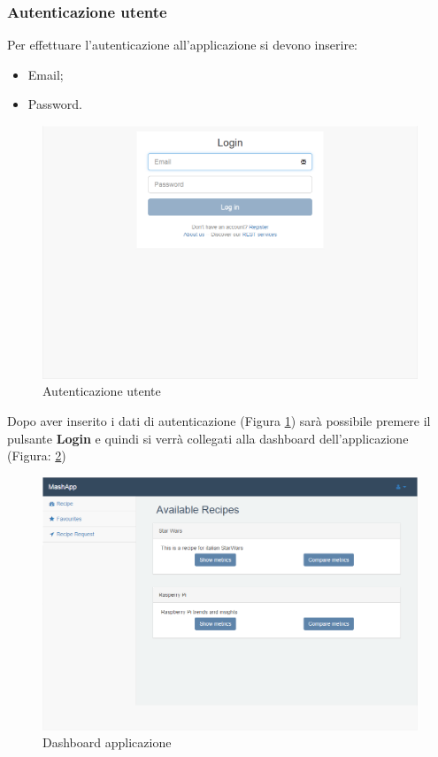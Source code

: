 		\pagebreak
		\subsubsection{Autenticazione utente} %
		\label{sec:autenticazione_utente}
			Per effettuare l'autenticazione\gloss{} all'applicazione si devono inserire:
			\begin{itemize}
				\item Email;
				\item Password.
			\end{itemize}
			\begin{figure}[H]
				\centering
				\centerline{\includegraphics[width=14cm]{images/autenticazione_utente.png}}
				\caption{Autenticazione utente}
				\label{fig:registrazione_utente_accesso}
			\end{figure}
			Dopo aver inserito i dati di autenticazione (Figura \ref{fig:registrazione_utente_accesso}) sarà possibile premere il pulsante \textbf{Login}\gloss{} e quindi si verrà collegati alla dashboard\gloss{} dell'applicazione (Figura: \ref{fig:dashboard})
			\begin{figure}[H]
				\centering
				\centerline{\includegraphics[width=19cm]{images/dashboard.png}}
				\caption{Dashboard applicazione}
				\label{fig:dashboard}
			\end{figure}



